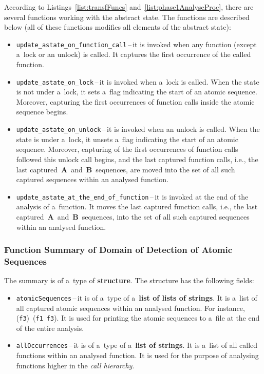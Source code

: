 According to Listings~\ref{list:transfFuncs}
and~\ref{list:phase1AnalyseProc}, there are several functions working
with the abstract state. The functions are described below (all of these
functions modifies all elements of the abstract state):
\begin{itemize}
    \item
        \texttt{update\_astate\_on\_function\_call}\,--\,it is invoked
        when any function (except a~lock or an unlock) is called. It
        captures the first occurrence of the called function.

    \item
        \texttt{update\_astate\_on\_lock}\,--\,it is invoked when a~lock
        is called. When the state is not under a~lock, it sets a~flag
        indicating the start of an atomic sequence. Moreover, capturing
        the first occurrences of function calls inside the atomic
        sequence begins.

    \item
        \texttt{update\_astate\_on\_unlock}\,--\,it is invoked when an
        unlock is called. When the state is under a~lock, it unsets
        a~flag indicating the start of an atomic sequence. Moreover,
        capturing of the first occurrences of function calls followed this
        unlock call begins, and the last captured function calls, i.e.,
        the last captured~\textbf{A}~and~\textbf{B}~sequences, are
        moved into the set of all such captured sequences within an
        analysed function.

    \item
        \texttt{update\_astate\_at\_the\_end\_of\_function}\,--\,it is
        invoked at the end of the analysis of a~function. It moves
        the last captured function calls, i.e., the last
        captured~\textbf{A}~and~\textbf{B}~sequences, into the set
        of all such captured sequences within an analysed function.
\end{itemize}

\subsubsection{Function Summary of Domain of Detection of Atomic Sequences}

The summary is of a~type of \textbf{structure}. The structure has the
following fields:
\begin{itemize}
    \item
        \texttt{atomicSequences}\,--\,it is of a~type of a~\textbf{list of
        lists of strings}. It is a~list of all captured atomic sequences
        within an analysed function. For instance,
        (\texttt{f3})~(\texttt{f1}~\texttt{f3}). It is used for printing
        the atomic sequences to a~file at the end of the entire analysis.

    \item
        \texttt{allOccurrences}\,--\,it is of a~type of a~\textbf{list of
        strings}. It is a~list of all called functions within an analysed
        function. It is used for the purpose of analysing functions
        higher in the \emph{call hierarchy}.
\end{itemize}

